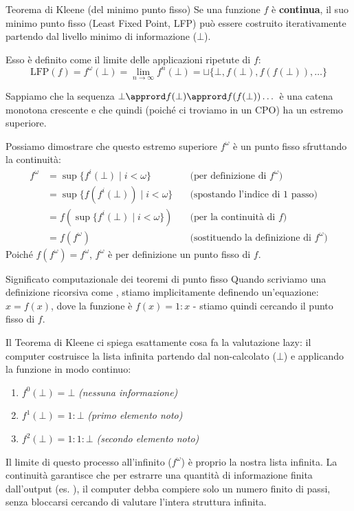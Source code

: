 \begin{defframe}{Teorema di Kleene (del minimo punto fisso)}{}
    Se una funzione $f$ è \textbf{continua}, il suo minimo punto fisso (Least Fixed Point, LFP) può essere costruito iterativamente partendo dal livello minimo di informazione ($\bot$).
    
    Esso è definito come il limite delle applicazioni ripetute di $f$:
    \[ \text{LFP}(f) = f^\omega(\bot) = \lim_{n\to\infty} f^n(\bot) = \sqcup \{ \bot, f(\bot), f(f(\bot)), \dots \} \]
    \begin{proofframe}
    Sappiamo che la sequenza $\bot \apprord f(\bot) \apprord f(f(\bot)) \dots$ è una catena monotona crescente e che quindi (poiché ci troviamo in un CPO) ha un estremo superiore.

    Possiamo dimostrare che questo estremo superiore $f^\omega$ è un punto fisso sfruttando la continuità:
    \begin{align*}
        f^\omega &= \sup \{ f^i(\bot) \mid i < \omega \} \quad &\text{(per definizione di } f^\omega \text{)} \\
        &= \sup \{ f(f^i(\bot)) \mid i < \omega \} \quad &\text{(spostando l'indice di 1 passo)} \\
        &= f(\sup \{ f^i(\bot) \mid i < \omega \}) \quad &\text{(per la continuità di } f\text{)} \\
        &= f(f^\omega) \quad &\text{(sostituendo la definizione di } f^\omega\text{)}
    \end{align*}
    Poiché $f(f^\omega) = f^\omega$, $f^\omega$ è per definizione un punto fisso di $f$.
    \end{proofframe}
\end{defframe}

\begin{gframe}{Significato computazionale dei teoremi di punto fisso}
Quando scriviamo una definizione ricorsiva come , stiamo implicitamente definendo un'equazione: $x = f(x)$, dove la funzione è $f(x) = 1 : x$ - stiamo quindi cercando il punto fisso di $f$.

Il Teorema di Kleene ci spiega esattamente cosa fa la valutazione lazy: il computer costruisce la lista infinita partendo dal non-calcolato ($\bot$) e applicando la funzione in modo continuo:
\begin{enumerate}
    \item $f^0(\bot) = \bot$ \hfill \textit{(nessuna informazione)}
    \item $f^1(\bot) = 1 : \bot$ \hfill \textit{(primo elemento noto)}
    \item $f^2(\bot) = 1 : 1 : \bot$ \hfill \textit{(secondo elemento noto)}
\end{enumerate}
Il limite di questo processo all'infinito ($f^\omega$) è proprio la nostra lista infinita. La continuità garantisce che per estrarre una quantità di informazione finita dall'output (es. ), il computer debba compiere solo un numero finito di passi, senza bloccarsi cercando di valutare l'intera struttura infinita.
\end{gframe}

